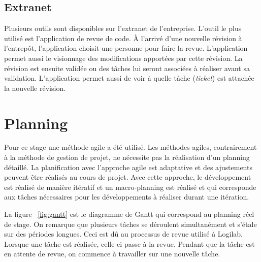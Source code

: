 \subsection{Extranet}
Plusieurs outils sont disponibles sur l'extranet de l'entreprise. L'outil le plus utilisé est l'application de revue de code. \`A l'arrivé d'une nouvelle révision à l'entrepôt, l'application choisit une personne pour faire la revue. L'application permet aussi le visionnage des modifications apportées par cette révision. La révision est ensuite validée ou des tâches lui seront associées à réaliser avant sa validation. L'application permet aussi de voir à quelle tâche (\textit{ticket}) est attachée la nouvelle révision.   

\section{Planning}
Pour ce stage une méthode agile a été utilisé. Les méthodes agiles, contrairement à la méthode de gestion de projet, ne nécessite pas la réalisation d'un planning détaillé. La planification avec l'approche agile est adaptative et des ajustements peuvent être réalisés au cours de projet. Avec cette approche, le développement est réalisé de manière itératif et un macro-planning est réalisé et qui corresponde aux tâches nécessaires pour les développements à réaliser durant une itération. 

La figure ~\ref{fig:gantt} est le diagramme de Gantt qui correspond au planning réel de stage. On remarque que plusieurs tâches se déroulent simultanément et s'étale sur des périodes longues. Ceci est dû au processus de revue utilisé à Logilab. Lorsque une tâche est réalisée, celle-ci passe à la revue. Pendant que la tâche est en attente de revue, on commence à travailler sur une nouvelle tâche.

